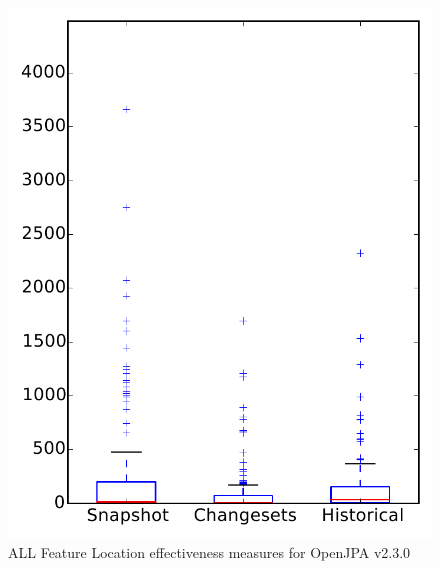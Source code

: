 
\begin{figure}
\centering
\includegraphics[height=0.4\textheight]{figures/flt/all_openjpa}
\caption{ALL Feature Location effectiveness measures for OpenJPA v2.3.0}
\label{fig:flt:all:openjpa}
\end{figure}
